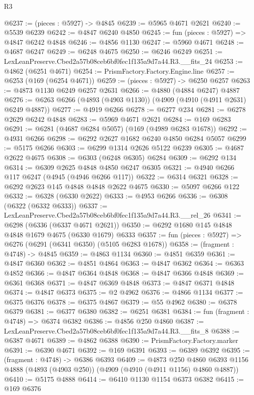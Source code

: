 \begin{lexlean}{R3}
\begin{coremodule}
@6237 := (pieces : @5927) -> @4845
@6239 := @5965 @4671 @2621
@6240 := @5539 @6239
@6242 := @4847 @6240 @4850
@6245 := fun (pieces : @5927) => @4847 @6242 @4848
@6246 := @4856 @1130
@6247 := @5960 @4671
@6248 := @4687 @6247
@6249 := @6248 @4675
@6250 := @6246 @6249
@6251 := LexLeanPreserve.Cbed2a57b08ceb6bf0fec1f135a9d7a44.R3.__fits_24
@6253 := @4862 (@6251 @4671)
@6254 := PrismFactory.Factory.Engine.line
@6257 := @6253 (@169 (@6254 @4671))
@6259 := (pieces : @5927) -> @6250 @6257
@6263 := @4873 @1130 @6249 @6257 @2631
@6266 := @4880 (@4884 @6247) @4887
@6276 := @6263 @6266 (@4893 (@4903 @1130)) (@4909 (@4910 (@4911 @2631) @6249 @4887))
@6277 := @4919 @6266
@6278 := @6277 @234
@6281 := @6278 @2629 @6242 @4848
@6283 := @5969 @4671 @2621
@6284 := @169 @6283
@6291 := @6281 (@4687 @6284 @5057) (@169 (@4989 @6283 @1678))
@6292 := @4931 @6266
@6298 := @6292 @2627 @1682 @6240 @4850 @6284 @5057
@6299 := @5175 @6266
@6303 := @6299 @1314 @2626 @5122 @6239
@6305 := @4687 @2622 @4675
@6308 := @6303 (@6248 @6305) @6284
@6309 := @6292 @134
@6314 := @6309 @2625 @4848 @4850 @6247 @6305
@6321 := @4940 @6266 @117 @6247 (@4945 (@4946 @6266 @117))
@6322 := @6314 @6321
@6328 := @6292 @2623 @145 @4848 @4848 @2622 @4675
@6330 := @5097 @6266 @122
@6332 := @6328 (@6330 @2622)
@6333 := @4953 @6266
@6336 := @6308 (@6322 (@6332 @6333))
@6337 := LexLeanPreserve.Cbed2a57b08ceb6bf0fec1f135a9d7a44.R3.__rel_26
@6341 := @6298 (@6336 (@6337 @4671 @2621))
@6350 := @6292 @1680 @145 @4848 @4848 @1679 @4675 (@6330 @1679) @6333
@6357 := fun (pieces : @5927) => @6276 (@6291 (@6341 @6350) (@5105 @6283 @1678))
@6358 := (fragment : @4748) -> @4845
@6359 := @4863 @1134
@6360 := @4851 @6359
@6361 := @4847 @6360
@6362 := @4851 @4864
@6363 := @4847 @6362
@6364 := @6363 @4852
@6366 := @4847 @6364 @4848
@6368 := @4847 @6366 @4848
@6369 := @6361 @6368
@6371 := @4847 @6369 @4848
@6373 := @4847 @6371 @4848
@6374 := @4847 @6373
@6375 := @2 @4962
@6376 := @4866 @1134
@6377 := @6375 @6376
@6378 := @6375 @4867
@6379 := @55 @4962
@6380 := @6378 @6379
@6381 := @6377 @6380
@6382 := @6251 @6381
@6384 := fun (fragment : @4748) => @6374 @6382
@6386 := @4856 @250 @4860
@6387 := LexLeanPreserve.Cbed2a57b08ceb6bf0fec1f135a9d7a44.R3.__fits_8
@6388 := @6387 @4671
@6389 := @4862 @6388
@6390 := PrismFactory.Factory.marker
@6391 := @6390 @4671
@6392 := @169 @6391
@6393 := @6389 @6392
@6395 := (fragment : @4748) -> @6386 @6393
@6409 := @4873
    @250
    @4860
    @6393
    @1156
    @4888
    (@4893 (@4903 @250))
    (@4909 (@4910 (@4911 @1156) @4860 @4887))
@6410 := @5175 @4888
@6414 := @6410 @1130 @1154 @6373 @6382
@6415 := @169 @6376

\end{coremodule}
\end{lexlean}
